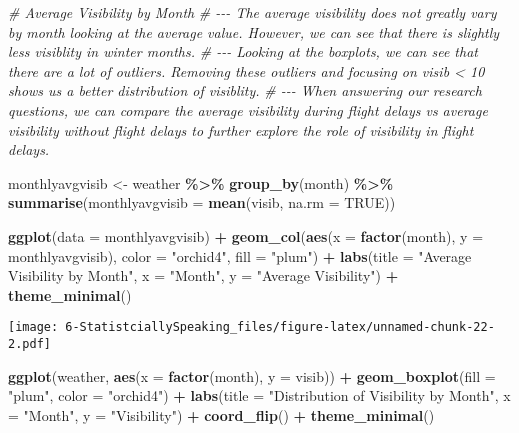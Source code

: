 \documentclass[
]{article}
\newenvironment{Shaded}{\begin{snugshade}}{\end{snugshade}}
\newcommand{\AttributeTok}[1]{\textcolor[rgb]{0.13,0.29,0.53}{#1}}
\newcommand{\CommentTok}[1]{\textcolor[rgb]{0.56,0.35,0.01}{\textit{#1}}}
\newcommand{\ConstantTok}[1]{\textcolor[rgb]{0.56,0.35,0.01}{#1}}
\newcommand{\FunctionTok}[1]{\textcolor[rgb]{0.13,0.29,0.53}{\textbf{#1}}}
\newcommand{\NormalTok}[1]{#1}
\newcommand{\OtherTok}[1]{\textcolor[rgb]{0.56,0.35,0.01}{#1}}
\newcommand{\SpecialCharTok}[1]{\textcolor[rgb]{0.81,0.36,0.00}{\textbf{#1}}}
\newcommand{\StringTok}[1]{\textcolor[rgb]{0.31,0.60,0.02}{#1}}
\begin{document}
\begin{Shaded}
\begin{Highlighting}[]
\CommentTok{\# Average Visibility by Month}
\CommentTok{\# {-}{-}{-} The average visibility does not greatly vary by month looking at the average value. However, we can see that there is slightly less visiblity in winter months.}
\CommentTok{\# {-}{-}{-} Looking at the boxplots, we can see that there are a lot of outliers. Removing these outliers and focusing on visib \textless{} 10 shows us a better distribution of visiblity.}
\CommentTok{\# {-}{-}{-} When answering our research questions, we can compare the average visibility during flight delays vs average visibility without flight       delays to further explore the role of visibility in flight delays. }

\NormalTok{monthlyavgvisib }\OtherTok{\textless{}{-}}\NormalTok{ weather }\SpecialCharTok{\%\textgreater{}\%}
  \FunctionTok{group\_by}\NormalTok{(month) }\SpecialCharTok{\%\textgreater{}\%}
  \FunctionTok{summarise}\NormalTok{(}\AttributeTok{monthlyavgvisib =} \FunctionTok{mean}\NormalTok{(visib, }\AttributeTok{na.rm =} \ConstantTok{TRUE}\NormalTok{))}

\FunctionTok{ggplot}\NormalTok{(}\AttributeTok{data =}\NormalTok{ monthlyavgvisib) }\SpecialCharTok{+}
    \FunctionTok{geom\_col}\NormalTok{(}\FunctionTok{aes}\NormalTok{(}\AttributeTok{x =} \FunctionTok{factor}\NormalTok{(month), }\AttributeTok{y =}\NormalTok{ monthlyavgvisib),}
                   \AttributeTok{color =} \StringTok{"orchid4"}\NormalTok{, }\AttributeTok{fill =} \StringTok{"plum"}\NormalTok{) }\SpecialCharTok{+} 
  \FunctionTok{labs}\NormalTok{(}\AttributeTok{title =} \StringTok{"Average Visibility by Month"}\NormalTok{,}
       \AttributeTok{x =} \StringTok{"Month"}\NormalTok{,}
       \AttributeTok{y =} \StringTok{"Average Visibility"}\NormalTok{) }\SpecialCharTok{+}
  \FunctionTok{theme\_minimal}\NormalTok{()}
\end{Highlighting}
\end{Shaded}

\texttt{[image: 6-StatistciallySpeaking\_files/figure-latex/unnamed-chunk-22-2.pdf]}

\begin{Shaded}
\begin{Highlighting}[]
\FunctionTok{ggplot}\NormalTok{(weather, }\FunctionTok{aes}\NormalTok{(}\AttributeTok{x =} \FunctionTok{factor}\NormalTok{(month), }\AttributeTok{y =}\NormalTok{ visib)) }\SpecialCharTok{+}
  \FunctionTok{geom\_boxplot}\NormalTok{(}\AttributeTok{fill =} \StringTok{"plum"}\NormalTok{, }\AttributeTok{color =} \StringTok{"orchid4"}\NormalTok{) }\SpecialCharTok{+}
  \FunctionTok{labs}\NormalTok{(}\AttributeTok{title =} \StringTok{"Distribution of Visibility by Month"}\NormalTok{,}
       \AttributeTok{x =} \StringTok{"Month"}\NormalTok{,}
       \AttributeTok{y =} \StringTok{"Visibility"}\NormalTok{) }\SpecialCharTok{+}
  \FunctionTok{coord\_flip}\NormalTok{() }\SpecialCharTok{+}
  \FunctionTok{theme\_minimal}\NormalTok{()}
\end{Highlighting}
\end{Shaded}
\end{document}
